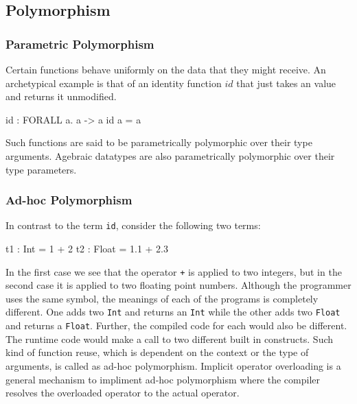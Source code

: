 \documentclass[manuscript,screen,nonacm]{acmart}
\begin{document}


\subsection{Polymorphism}
\subsubsection{Parametric Polymorphism}
Certain functions behave uniformly on the data that they might receive. An archetypical example is that of an identity function $id$ that just takes an value and returns it unmodified.
\begin{code}
  id : FORALL a. a -> a
  id a = a
\end{code}
Such functions are said to be parametrically polymorphic over their type arguments\cite{strachey_fundamental_2000}.
Agebraic datatypes are also parametrically polymorphic over their type parameters.

\subsubsection{Ad-hoc Polymorphism}
In contrast to the term \lstinline{id}, consider the following two terms:
\begin{code}
    t1 : Int = 1 + 2
    t2 : Float = 1.1 + 2.3
\end{code}

In the first case we see that the operator \lstinline{+} is applied to two integers, but in the second case it is applied to two floating point numbers. Although the programmer uses the same symbol, the meanings of each of the programs is completely different. One adds two \lstinline{Int} and returns an \lstinline{Int} while the other adds two \lstinline{Float} and returns a \lstinline{Float}. Further, the compiled code for each would also be different. The runtime code would make a call to two different built in constructs. Such kind of function reuse, which is dependent on the context or the type of arguments, is called as ad-hoc polymorphism\cite{strachey_fundamental_2000}. Implicit operator overloading is a general mechanism to impliment ad-hoc polymorphism where the compiler resolves the overloaded operator to the actual operator.
\end{document}
